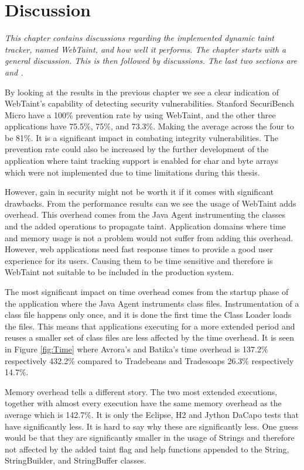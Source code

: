 \chapter{Discussion}
\label{Discussion}
\textit{This chapter contains discussions regarding the implemented dynamic taint tracker, named WebTaint, and how well it performs. The chapter starts with a general discussion. This is then followed by \textit{} discussions. The last two sections are \textit{} and \textit{}.}

By looking at the results in the previous chapter we see a clear indication of WebTaint's capability of detecting security vulnerabilities. Stanford SecuriBench Micro have a 100\% prevention rate by using WebTaint, and the other three applications have 75.5\%, 75\%, and 73.3\%. Making the average across the four to be 81\%. It is a significant impact in combating integrity vulnerabilities. The prevention rate could also be increased by the further development of the application where taint tracking support is enabled for char and byte arrays which were not implemented due to time limitations during this thesis.

However, gain in security might not be worth it if it comes with significant drawbacks. From the performance results can we see the usage of WebTaint adds overhead. This overhead comes from the Java Agent instrumenting the classes and the added operations to propagate taint. Application domains where time and memory usage is not a problem would not suffer from adding this overhead. However, web applications need fast response times to provide a good user experience for its users. Causing them to be time sensitive and therefore is WebTaint not suitable to be included in the production system.

The most significant impact on time overhead comes from the startup phase of the application where the Java Agent instruments class files. Instrumentation of a class file happens only once, and it is done the first time the Class Loader loads the files. This means that applications executing for a more extended period and reuses a smaller set of class files are less affected by the time overhead. It is seen in Figure \ref{fig:Time} where Avrora's and Batika's time overhead is 137.2\% respectively 432.2\% compared to Tradebeans and Tradesoaps 26.3\% respectively 14.7\%.

Memory overhead tells a different story. The two most extended executions, together with almost every execution have the same memory overhead as the average which is 142.7\%. It is only the Eclipse, H2 and Jython DaCapo tests that have significantly less. It is hard to say why these are significantly less. One guess would be that they are significantly smaller in the usage of Strings and therefore not affected by the added taint flag and help functions appended to the String, StringBuilder, and StringBuffer classes.



